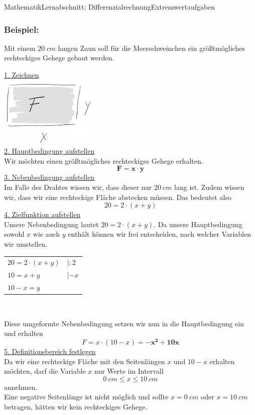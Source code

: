 \documentclass[11pt,twocolumn,oneside,openany,headings=optiontotoc,11pt,numbers=noenddot]{article}
\begin{document}
\begin{worksheet}{Mathematik}{Lernabschnitt: Differenzialrechnung}{Extremwertaufgaben}
		\subsubsection*{Beispiel:}
		\begin{framed}
			\noindent
			Mit einem \(20\ cm\) langen Zaun soll für die Meerschweinchen ein größtmögliches rechteckiges Gehege gebaut werden.
		\end{framed}
		\underline{1. Zeichnen}\\
		\includegraphics[width=0.35\textwidth]{../99_Bilder/04-6_skizze.jpg}\\
		\underline{2. Hauptbedingung aufstellen}\\
		Wir möchten einen größtmögliches rechteckiges Gehege erhalten.
		\[\mathbf{F = x\cdot{}y}\]
		\underline{3. Nebenbedingung aufstellen}\\
		Im Falle des Drahtes wissen wir, dass dieser nur \(20\ cm\) lang ist. Zudem wissen wir, dass wir eine rechteckige Fläche abstecken müssen. Das bedeutet also
		\[20 = 2\cdot(x+y)\]
		\underline{4. Zielfunktion aufstellen}\\
		Unsere Nebenbedingung lautet \(20 = 2\cdot(x+y)\). Da unsere Hauptbedingung sowohl \(x\) wie auch \(y\) enthält können wir frei entscheiden, nach welcher Variablen wir umstellen.\\
		\begin{tabularx}{0.48\textwidth}{Ml}
			\(20 = 2\cdot(x+y)\) & |\(: 2\)\\
			\(10 = x+y\) & |\(-x\)\\
			\(10 - x = y\)
		\end{tabularx}\\
		\par\noindent
		Diese umgeformte Nebenbedingung setzen wir nun in die Hauptbedingung ein und erhalten \[F = x\cdot(10-x) = \mathbf{-x^2 + 10x}\]
		\underline{5. Definitionsbereich festlegen}\\
		Da wir eine rechteckige Fläche mit den Seitenlängen \(x\) und \(10-x\) erhalten möchten, darf die Variable \(x\) nur Werte im Intervall \[0\ cm \le x \le 10\ cm\] annehmen.\\
		Eine negative Seitenlänge ist nicht möglich und sollte \(x = 0\ cm\) oder \(x = 10\ cm\) betragen, hätten wir kein rechteckiges Gehege.\\

\end{worksheet}
\end{document}
